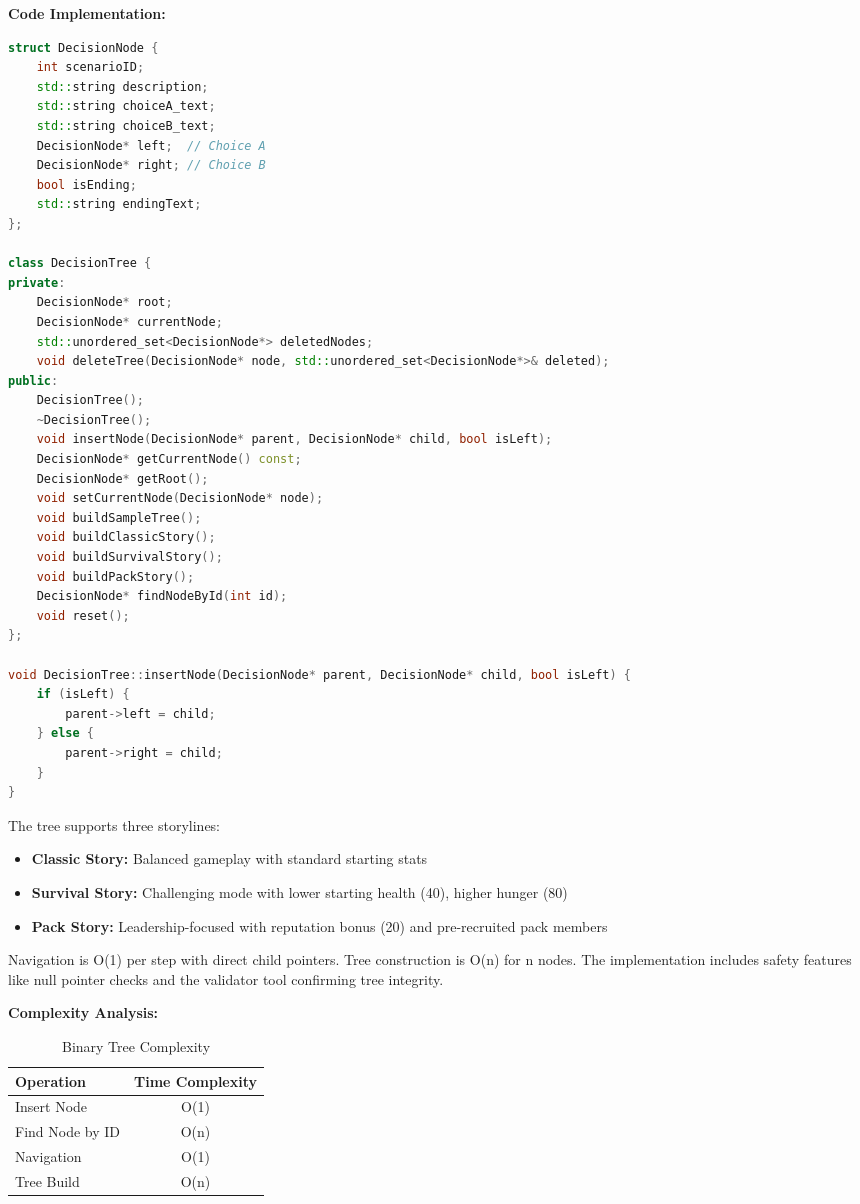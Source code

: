 \documentclass[12pt,a4paper]{article}
\begin{document}
\textbf{Code Implementation:}
\begin{lstlisting}[language=C++, caption={Binary Tree Node Structure and Insertion}]
struct DecisionNode {
    int scenarioID;
    std::string description;
    std::string choiceA_text;
    std::string choiceB_text;
    DecisionNode* left;  // Choice A
    DecisionNode* right; // Choice B
    bool isEnding;
    std::string endingText;
};

class DecisionTree {
private:
    DecisionNode* root;
    DecisionNode* currentNode;
    std::unordered_set<DecisionNode*> deletedNodes;
    void deleteTree(DecisionNode* node, std::unordered_set<DecisionNode*>& deleted);
public:
    DecisionTree();
    ~DecisionTree();
    void insertNode(DecisionNode* parent, DecisionNode* child, bool isLeft);
    DecisionNode* getCurrentNode() const;
    DecisionNode* getRoot();
    void setCurrentNode(DecisionNode* node);
    void buildSampleTree();
    void buildClassicStory();
    void buildSurvivalStory();
    void buildPackStory();
    DecisionNode* findNodeById(int id);
    void reset();
};

void DecisionTree::insertNode(DecisionNode* parent, DecisionNode* child, bool isLeft) {
    if (isLeft) {
        parent->left = child;
    } else {
        parent->right = child;
    }
}
\end{lstlisting}

The tree supports three storylines:
\begin{itemize}
	\item \textbf{Classic Story:} Balanced gameplay with standard starting stats
	\item \textbf{Survival Story:} Challenging mode with lower starting health (40), higher hunger (80)
	\item \textbf{Pack Story:} Leadership-focused with reputation bonus (20) and pre-recruited pack members
\end{itemize}

Navigation is O(1) per step with direct child pointers. Tree construction is O(n) for n nodes. The implementation includes safety features like null pointer checks and the validator tool confirming tree integrity.

\textbf{Complexity Analysis:}
\begin{table}[h]
	\centering
	\caption{Binary Tree Complexity}
	\begin{tabular}{@{}lc@{}}
		\toprule
		\textbf{Operation} & \textbf{Time Complexity} \\ \midrule
		Insert Node        & O(1)                     \\
		Find Node by ID    & O(n)                     \\
		Navigation         & O(1)                     \\
		Tree Build         & O(n)                     \\
		\bottomrule
	\end{tabular}
\end{table}
\end{document}
